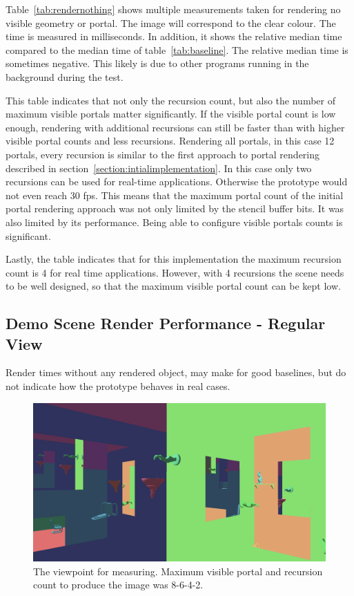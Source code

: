 Table~\ref{tab:rendernothing} shows multiple measurements taken for rendering no visible geometry or portal. The image will correspond to the clear colour. The time is measured in milliseconds. In addition, it shows the relative median time compared to the median time of table~\ref{tab:baseline}. The relative median time is sometimes negative. This likely is due to other programs running in the background during the test.

This table indicates that not only the recursion count, but also the number of maximum visible portals matter significantly. If the visible portal count is low enough, rendering with additional recursions can still be faster than with higher visible portal counts and less recursions. Rendering all portals, in this case 12 portals, every recursion is similar to the first approach to portal rendering described in section~\ref{section:intialimplementation}. In this case only two recursions can be used for real-time applications. Otherwise the prototype would not even reach 30 \gls{fps}. This means that the maximum portal count of the initial portal rendering approach was not only limited by the stencil buffer bits. It was also limited by its performance. Being able to configure visible portals counts is significant.

Lastly, the table indicates that for this implementation the maximum recursion count is 4 for real time applications. However, with 4 recursions the scene needs to be well designed, so that the maximum visible portal count can be kept low.






\subsection{Demo Scene Render Performance - Regular View}
\label{section:renderperformance}

Render times without any rendered object, may make for good baselines, but do not indicate how the prototype behaves in real cases. 

\begin{figure}[H]
	\includegraphics[width=\linewidth]{images/testsnapshot.png}
	\caption{The  viewpoint for measuring. Maximum visible portal and recursion count to produce the image was 8-6-4-2.}
	\label{fig:perfviewpoint}
\end{figure}

